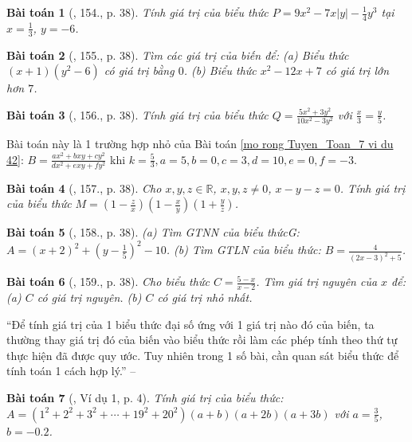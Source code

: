 \documentclass{article}
\newtheorem{baitoan}{Bài toán}
\begin{document}
\begin{baitoan}[\cite{Tuyen_Toan_7}, 154., p. 38]
	Tính giá trị của biểu thức $P = 9x^2 - 7x|y| - \frac{1}{4}y^3$ tại $x = \frac{1}{3}$, $y = -6$.
\end{baitoan}

\begin{baitoan}[\cite{Tuyen_Toan_7}, 155., p. 38]
	Tìm các giá trị của biến để: (a) Biểu thức $(x + 1)(y^2 - 6)$ có giá trị bằng $0$. (b) Biểu thức $x^2 - 12x + 7$ có giá trị lớn hơn $7$.
\end{baitoan}

\begin{baitoan}[\cite{Tuyen_Toan_7}, 156., p. 38]
	Tính giá trị của biểu thức $Q = \frac{5x^2 + 3y^2}{10x^2 - 3y^2}$ với $\frac{x}{3} = \frac{y}{5}$.
\end{baitoan}
Bài toán này là 1 trường hợp nhỏ của Bài toán \ref{mo rong Tuyen_Toan_7 vi du 42}: $B = \frac{ax^2 + bxy + cy^2}{dx^2 + exy + fy^2}$ khi $k = \frac{5}{3}, a = 5, b = 0, c = 3, d = 10, e = 0, f = -3$.

\begin{baitoan}[\cite{Tuyen_Toan_7}, 157., p. 38]
	Cho $x,y,z\in\mathbb{R}$, $x,y,z\ne0$, $x - y - z = 0$. Tính giá trị của biểu thức $M = \left(1 - \frac{z}{x}\right)\left(1 - \frac{x}{y}\right)\left(1 + \frac{y}{z}\right)$.
\end{baitoan}

\begin{baitoan}[\cite{Tuyen_Toan_7}, 158., p. 38]
	(a) Tìm GTNN của biểu thứcG: $A = (x + 2)^2 + \left(y - \frac{1}{5}\right)^2 - 10$. (b) Tìm GTLN của biểu thức: $B = \frac{4}{(2x - 3)^2 + 5}$.
\end{baitoan}

\begin{baitoan}[\cite{Tuyen_Toan_7}, 159., p. 38]
	Cho biểu thức $C = \frac{5 - x}{x - 2}$. Tìm giá trị nguyên của $x$ để: (a) $C$ có giá trị nguyên. (b) $C$ có giá trị nhỏ nhất.
\end{baitoan}
``Để tính giá trị của 1 biểu thức đại số ứng với 1 giá trị nào đó của biến, ta thường thay giá trị đó của biến vào biểu thức rồi làm các phép tính theo thứ tự thực hiện đã được quy ước. Tuy nhiên trong 1 số bài, cần quan sát biểu thức để tính toán 1 cách hợp lý.'' -- \cite[p. 4]{Binh_Toan_7_tap_2}

\begin{baitoan}[\cite{Binh_Toan_7_tap_2}, Ví dụ 1, p. 4]
	Tính giá trị của biểu thức: $A = (1^2 + 2^2 + 3^2 + \cdots + 19^2 + 20^2)(a + b)(a + 2b)(a + 3b)$ với $a = \frac{3}{5}$, $b = -0.2$.
\end{baitoan}
\end{document}
